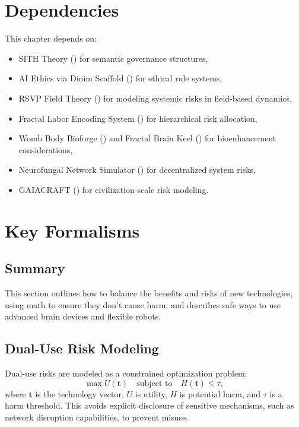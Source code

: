 \documentclass[11pt,oneside]{memoir}
\theoremstyle{plain}
\begin{document}
\section{Dependencies}
This chapter depends on:
\begin{itemize}
    \item SITH Theory () for semantic governance structures,
    \item AI Ethics via Dinim Scaffold () for ethical rule systems,
    \item RSVP Field Theory () for modeling systemic risks in field-based dynamics,
    \item Fractal Labor Encoding System () for hierarchical risk allocation,
    \item Womb Body Bioforge () and Fractal Brain Keel () for bioenhancement considerations,
    \item Neurofungal Network Simulator () for decentralized system risks,
    \item GAIACRAFT () for civilization-scale risk modeling.
\end{itemize}

\section{Key Formalisms}
\subsection{Summary}
This section outlines how to balance the benefits and risks of new technologies, using math to ensure they don’t cause harm, and describes safe ways to use advanced brain devices and flexible robots.

\subsection{Dual-Use Risk Modeling}
Dual-use risks are modeled as a constrained optimization problem:
\begin{equation}
    \max U(\mathbf{t}) \quad \text{subject to} \quad H(\mathbf{t}) \leq \tau,
    \label{eq:dual_use}
\end{equation}
where \(\mathbf{t}\) is the technology vector, \(U\) is utility, \(H\) is potential harm, and \(\tau\) is a harm threshold. This avoids explicit disclosure of sensitive mechanisms, such as network disruption capabilities, to prevent misuse.
\end{document}
